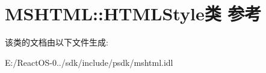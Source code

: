 \hypertarget{class_m_s_h_t_m_l_1_1_h_t_m_l_style}{}\section{M\+S\+H\+T\+ML\+:\+:H\+T\+M\+L\+Style类 参考}
\label{class_m_s_h_t_m_l_1_1_h_t_m_l_style}


该类的文档由以下文件生成\+:\begin{DoxyCompactItemize}
\item 
E\+:/\+React\+O\+S-\/0../sdk/include/psdk/mshtml.\+idl\end{DoxyCompactItemize}
